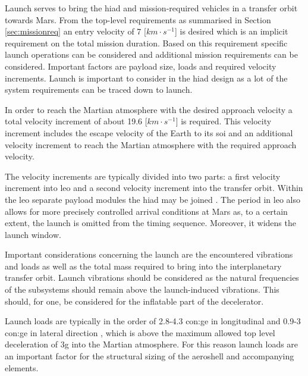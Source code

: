 Launch serves to bring the \gls{hiad} and mission-required vehicles in a transfer orbit towards Mars. From the top-level requirements as summarised in Section \ref{sec:missionreq} an entry velocity of 7 [$km\cdot s^{-1}$] is desired which is an implicit requirement on the total mission duration.
Based on this requirement specific launch operations can be considered and additional mission requirements can be considered. Important factors are payload size, loads and required velocity increments. Launch is important to consider in the \gls{hiad} design as a lot of the system requirements can be traced down to launch.

In order to reach the Martian atmosphere with the desired approach velocity a total velocity increment of about 19.6 [$km\cdot s^{-1}$] is required. This velocity increment includes the escape velocity of the Earth to its \gls{soi} and an additional velocity increment to reach the Martian atmosphere with the required approach velocity.

The velocity increments are typically divided into two parts: a first velocity increment into \gls{leo} and a second velocity increment into the transfer orbit. Within the \gls{leo} separate payload modules the \gls{hiad} may be joined \cite{George2009}. The period in \gls{leo} also allows for more precisely controlled arrival conditions at Mars as, to a certain extent, the launch is omitted from the timing sequence. Moreover, it widens the launch window.


Important considerations concerning the launch are the encountered vibrations and loads as well as the total mass required to bring into the interplanetary transfer orbit. Launch vibrations should be considered as the natural frequencies of the subsystems should remain above the launch-induced vibrations. This should, for one, be considered for the inflatable part of the decelerator.

Launch loads are typically in the order of 2.8-4.3 \gls{con:ge} in longitudinal and 0.9-3 \gls{con:ge} in lateral direction \cite{Wertz2011}, which is above the maximum allowed top level deceleration of 3g into the Martian atmosphere. For this reason launch loads are an important factor for the structural sizing of the aeroshell and accompanying elements. 

